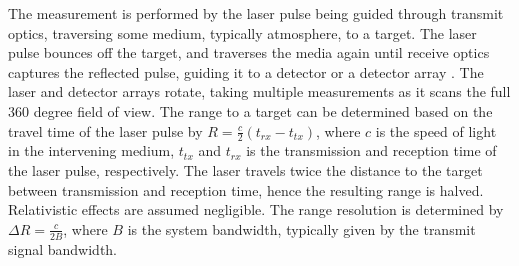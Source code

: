The measurement is performed by the laser pulse being guided through transmit optics, traversing some medium, typically atmosphere, to a target. The laser pulse bounces off the target, and traverses the media again until receive optics captures the reflected pulse, guiding it to a detector or a detector array \cite{SpieLidar}. The laser and detector arrays rotate, taking multiple measurements as it scans the full 360 degree field of view. The range to a target can be determined based on the travel time of the laser pulse by $R=\frac{c}{2}(t_{rx}-t_{tx})$, where $c$ is the speed of light in the intervening medium, $t_{tx}$ and $t_{rx}$ is the transmission and reception time of the laser pulse, respectively. The laser travels twice the distance to the target between transmission and reception time, hence the resulting range is halved. Relativistic effects are assumed negligible. The range resolution is determined by $\Delta R=\frac{c}{2B}$, where $B$ is the system bandwidth, typically given by the transmit signal bandwidth.

